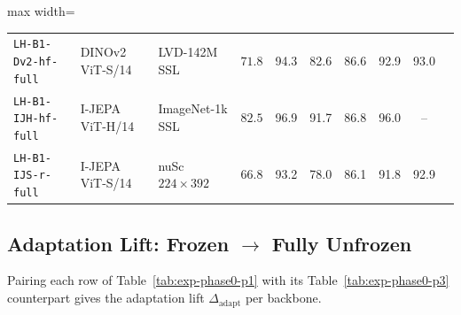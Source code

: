 \begin{table}[ht]
\begin{adjustbox}{max width=\textwidth}
\begin{tabular}{@{}>{\raggedright\arraybackslash}p{3.2cm} >{\raggedright\arraybackslash}p{2.4cm} >{\raggedright\arraybackslash}p{2.6cm} ccccccc@{}}
\texttt{LH-B1-Dv2-hf-full} & DINOv2 ViT-S/14 & LVD-142M SSL          & $71.8$ & 94.3 & 82.6 & 86.6 & 92.9 & 93.0 \\
\texttt{LH-B1-IJH-hf-full} & I-JEPA ViT-H/14 & ImageNet-1k SSL       & $82.5$ & 96.9 & 91.7 & 86.8 & 96.0 & -- \\
\texttt{LH-B1-IJS-r-full}  & I-JEPA ViT-S/14 & nuSc $224{\times}392$ & $66.8$ & 93.2 & 78.0 & 86.1 & 91.8 & 92.9 \\
\bottomrule
\end{tabular}
\end{adjustbox}
\end{table}

\subsection{Adaptation Lift: Frozen $\to$ Fully Unfrozen}
\label{sec:exp-phase0-lift}

Pairing each row of Table~\ref{tab:exp-phase0-p1} with its Table~\ref{tab:exp-phase0-p3} counterpart gives the adaptation lift $\Delta_\text{adapt}$ per backbone.

